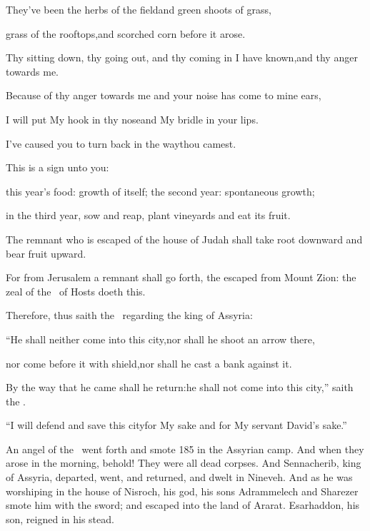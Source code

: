 \begin{inparaenum}
  \pa{}They've been the herbs of the field\pa{}and green shoots of grass,%

  \pa{}grass of the rooftops,\pa{}and scorched corn before it arose.%

  \pa{} Thy sitting down, thy going out, and thy coming in I have known,\pa{}and thy anger towards me.%

  \pa{} Because of thy anger towards me and your noise has come to mine ears,%

  \pa{}I will put My hook in thy nose\pa{}and My bridle in your lips.%

  \pa{}I've caused you to turn back in the way\pa{}thou camest.%

  \noindent {} This is a sign unto you:%

  \noindent this year's food: growth of itself; the second year: spontaneous growth;%

  \noindent in the third year, sow and reap, plant vineyards and eat its fruit.%

  \noindent {} The remnant who is escaped of the house of Judah shall take root downward and bear fruit upward.%

  \noindent {} For from Jerusalem a remnant shall go forth, the escaped from Mount Zion: the zeal of the \lord\ of Hosts doeth this.%

  \pb{} Therefore, thus saith the \lord\ regarding the king of Assyria:%

  \pb{}``He shall neither come into this city,\pa{}nor shall he shoot an arrow there,%

  \pb{}nor come before it with shield,\pa{}nor shall he cast a bank against it.%

  \pb{} By the way that he came shall he return:\pa{}he shall not come into this city,'' saith the \lord.%

  \pb{} ``I will defend and save this city\pa{}for My sake and for My servant David's sake.''%

  \noindent {} An angel of the \lord\ went forth and smote 185 in the Assyrian camp. And when they arose in the morning, behold! They were all dead corpses.  And Sennacherib, king of Assyria, departed, went, and returned, and dwelt in Nineveh.  And as he was worshiping in the house of Nisroch, his god, his sons Adrammelech and Sharezer smote him with the sword; and escaped into the land of Ararat. Esarhaddon, his son, reigned in his stead.%
\end{inparaenum}
